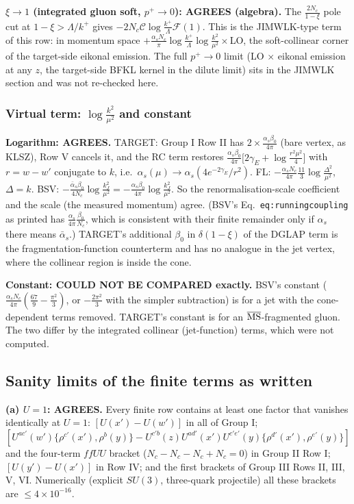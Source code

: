 \noindent\textbf{$\xi\to1$ (integrated gluon soft, $p^{+}\to0$): AGREES (algebra).} The $\frac{2N_{c}}{1-\xi}$ pole cut at $1-\xi>\Lambda/k^{+}$ gives $-2N_{c}\mathcal C\log\frac{k^{+}}{\Lambda}\mathcal F(1)$. This is the JIMWLK-type term of this row: in momentum space $+\frac{\alpha_{s}N_{c}}{\pi}\log\frac{k^{+}}{\Lambda}\log\frac{k^{2}}{\mu^{2}}\times$LO, the soft-collinear corner of the target-side eikonal emission. The full $p^{+}\to0$ limit (LO $\times$ eikonal emission at any $z$, the target-side BFKL kernel in the dilute limit) sits in the JIMWLK section and was not re-checked here.

\subsubsection{Virtual term: $\log\frac{k^{2}}{\mu^{2}}$ and constant}
\textbf{Logarithm: AGREES.} TARGET: Group I Row II has $2\times\frac{\alpha_{s}\beta_{0}}{4\pi}$ (bare vertex, as KLSZ), Row V cancels it, and the RC term restores $\frac{\alpha_{s}\beta_{0}}{4\pi}\big[2\gamma_{E}+\log\frac{r^{2}\mu^{2}}{4}\big]$ with $r=w-w'$ conjugate to $k$, i.e.\ $\alpha_{s}(\mu)\to\alpha_{s}(4e^{-2\gamma_{E}}/r^{2})$. FL: $-\frac{\alpha_{s}N_{c}}{4\pi}\frac{11}{3}\log\frac{\Delta^{2}}{\mu^{2}}$, $\Delta=k$. BSV: $-\frac{\bar\alpha_{s}\beta_{0}}{4N_{c}}\log\frac{k_{J}^{2}}{\mu^{2}}=-\frac{\alpha_{s}\beta_{0}}{4\pi}\log\frac{k_{J}^{2}}{\mu^{2}}$. So the renormalisation-scale coefficient and the scale (the measured momentum) agree. (BSV's Eq.~\texttt{eq:runningcoupling} as printed has $\frac{\alpha_{s}}{4\pi}\frac{\beta_{0}}{N_{c}}$, which is consistent with their finite remainder only if $\alpha_{s}$ there means $\bar\alpha_{s}$.) TARGET's additional $\beta_{0}$ in $\delta(1-\xi)$ of the DGLAP term is the fragmentation-function counterterm and has no analogue in the jet vertex, where the collinear region is inside the cone.

\noindent\textbf{Constant: COULD NOT BE COMPARED exactly.} BSV's constant ($\frac{\alpha_{s}N_{c}}{4\pi}(\frac{67}{9}-\frac{\pi^{2}}{3})$, or $-\frac{2\pi^{2}}{3}$ with the simpler subtraction) is for a jet with the cone-dependent terms removed. TARGET's constant is for an $\overline{\rm MS}$-fragmented gluon. The two differ by the integrated collinear (jet-function) terms, which were not computed.

\subsection{Sanity limits of the finite terms as written}
\textbf{(a) $U=1$: AGREES.} Every finite row contains at least one factor that vanishes identically at $U=1$: $[U(x')-U(w')]$ in all of Group I; $[U^{ac'}(w')\{\rho^{c'}(x'),\rho^{b}(y)\}-U^{c'b}(z)U^{ad'}(x')U^{c'e'}(y)\{\rho^{d'}(x'),\rho^{e'}(y)\}]$ and the four-term $ffUU$ bracket ($N_{c}-N_{c}-N_{c}+N_{c}=0$) in Group II Row I; $[U(y')-U(x')]$ in Row IV; and the first brackets of Group III Rows II, III, V, VI. Numerically (explicit $SU(3)$, three-quark projectile) all these brackets are $\le4\times10^{-16}$.

